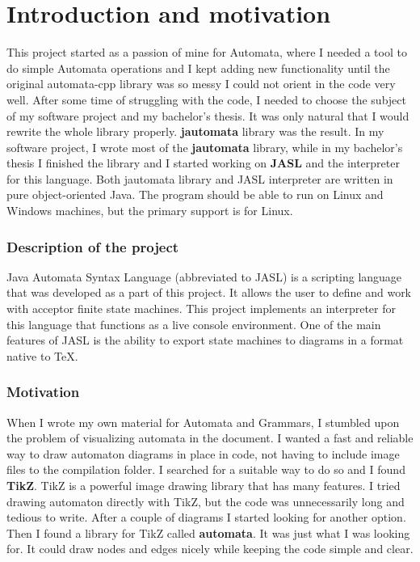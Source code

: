 \documentclass{ctuthesis}
\begin{document}
\maketitle

\chapter{Introduction and motivation}
This project started as a passion of mine for Automata, where I needed a tool to do simple Automata operations and I kept adding new functionality until the original automata-cpp library was so messy I could not orient in the code very well. After some time of struggling with the code, I needed to choose the subject of my software project and my bachelor's thesis. It was only natural that I would rewrite the whole library properly. \textbf{jautomata} library was the result. In my software project, I wrote most of the \textbf{jautomata} library, while in my bachelor's thesis I finished the library and I started working on \textbf{JASL} and the interpreter for this language. Both jautomata library and JASL interpreter are written in pure object-oriented Java. The program should be able to run on Linux and Windows machines, but the primary support is for Linux.

\subsection{Description of the project}
Java Automata Syntax Language (abbreviated to JASL) is a scripting language that was developed as a part of this project. It allows the user to define and work with acceptor finite state machines. This project implements an interpreter for this language that functions as a live console environment. One of the main features of JASL is the ability to export state machines to diagrams in a format native to \TeX.

\subsection{Motivation}

When I wrote my own material for Automata and Grammars, I stumbled upon the problem of visualizing automata in the document. I wanted a fast and reliable way to draw automaton diagrams in place in code, not having to include image files to the compilation folder. I searched for a suitable way to do so and I found \textbf{TikZ}. TikZ is a powerful image drawing library that has many features. I tried drawing automaton directly with TikZ, but the code was unnecessarily long and tedious to write. After a couple of diagrams I started looking for another option. Then I found a library for TikZ called \textbf{automata}. It was just what I was looking for. It could draw nodes and edges nicely while keeping the code simple and clear. 
\end{document}
